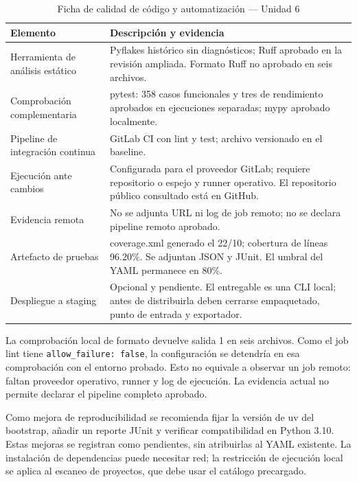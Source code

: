 \begin{table}[H]
\centering\small{}
\caption{Ficha de calidad de código y automatización --- Unidad 6}
\begin{tabularx}{\textwidth}{P{4cm}Y}
\toprule
\textbf{Elemento} & \textbf{Descripción y evidencia} \\
\midrule
Herramienta de análisis estático & Pyflakes histórico sin diagnósticos; Ruff aprobado en la revisión ampliada. Formato Ruff no aprobado en seis archivos. \\
\addlinespace
Comprobación complementaria & pytest: 358 casos funcionales y tres de rendimiento aprobados en ejecuciones separadas; mypy aprobado localmente. \\
\addlinespace
Pipeline de integración continua & GitLab CI con lint y test; archivo versionado en el baseline. \\
\addlinespace
Ejecución ante cambios & Configurada para el proveedor GitLab; requiere repositorio o espejo y runner operativo. El repositorio público consultado está en GitHub. \\
\addlinespace
Evidencia remota & No se adjunta URL ni log de job remoto; no se declara pipeline remoto aprobado. \\
\addlinespace
Artefacto de pruebas & coverage.xml generado el 22/10; cobertura de líneas 96.20\%. Se adjuntan JSON y JUnit. El umbral del YAML permanece en 80\%. \\
\addlinespace
Despliegue a staging & Opcional y pendiente. El entregable es una CLI local; antes de distribuirla deben cerrarse empaquetado, punto de entrada y exportador. \\
\bottomrule
\end{tabularx}
\end{table}

La comprobación local de formato devuelve salida 1 en seis archivos. Como el job lint tiene \texttt{allow\_\allowbreak failure: false}, la configuración se detendría en esa comprobación con el entorno probado. Esto no equivale a observar un job remoto: faltan proveedor operativo, runner y log de ejecución. La evidencia actual no permite declarar el pipeline completo aprobado.

Como mejora de reproducibilidad se recomienda fijar la versión de uv del bootstrap, añadir un reporte JUnit y verificar compatibilidad en Python 3.10. Estas mejoras se registran como pendientes, sin atribuirlas al YAML existente. La instalación de dependencias puede necesitar red; la restricción de ejecución local se aplica al escaneo de proyectos, que debe usar el catálogo precargado.


